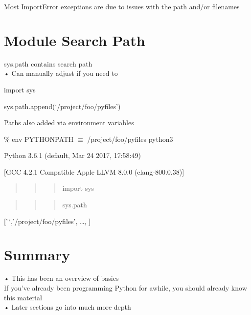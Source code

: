 \documentclass[
  letterpaper,
  DIV=11,
  numbers=noendperiod]{scrreprt}
\begin{document}
Most ImportError exceptions are due to issues with the path and/or
filenames


\chapter{Module Search Path}\label{module-search-path}

sys.path contains search path\\
• Can manually adjust if you need to

import sys

sys.path.append(`/project/foo/pyfiles')

Paths also added via environment variables

\% env PYTHONPATH \(\mathbf { \equiv }\) /project/foo/pyfiles python3

Python 3.6.1 (default, Mar 24 2017, 17:58:49)

{[}GCC 4.2.1 Compatible Apple LLVM 8.0.0 (clang-800.0.38){]}

\begin{quote}
\begin{quote}
\begin{quote}
import sys
\end{quote}
\end{quote}
\end{quote}

\begin{quote}
\begin{quote}
\begin{quote}
sys.path
\end{quote}
\end{quote}
\end{quote}

{[}'\,`,'/project/foo/pyfiles', \ldots, {]}


\chapter{Summary}\label{summary}

• This has been an overview of basics\\
If you've already been programming Python for awhile, you should already
know this material\\
• Later sections go into much more depth

\end{document}
